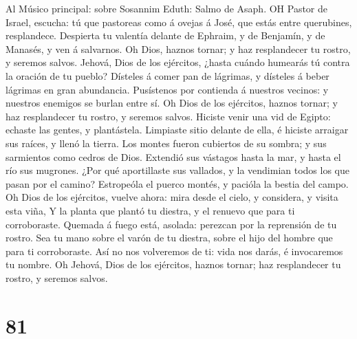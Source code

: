  Al Músico principal: sobre Sosannim Eduth: Salmo de Asaph.
OH Pastor de Israel, escucha: tú que pastoreas como á ovejas á José, que
estás entre querubines, resplandece.  Despierta tu valentía
delante de Ephraim, y de Benjamín, y de Manasés, y ven á salvarnos.
 Oh Dios, haznos tornar; y haz resplandecer tu rostro, y
seremos salvos.  Jehová, Dios de los ejércitos, ¿hasta
cuándo humearás tú contra la oración de tu pueblo?  Dísteles
á comer pan de lágrimas, y dísteles á beber lágrimas en gran abundancia.
 Pusístenos por contienda á nuestros vecinos: y nuestros
enemigos se burlan entre sí.  Oh Dios de los ejércitos,
haznos tornar; y haz resplandecer tu rostro, y seremos salvos.
 Hiciste venir una vid de Egipto: echaste las gentes, y
plantástela.  Limpiaste sitio delante de ella, é hiciste
arraigar sus raíces, y llenó la tierra.  Los montes fueron
cubiertos de su sombra; y sus sarmientos como cedros de Dios.
 Extendió sus vástagos hasta la mar, y hasta el río sus
mugrones.  ¿Por qué aportillaste sus vallados, y la
vendimian todos los que pasan por el camino?  Estropeóla el
puerco montés, y pacióla la bestia del campo.  Oh Dios de
los ejércitos, vuelve ahora: mira desde el cielo, y considera, y visita
esta viña,  Y la planta que plantó tu diestra, y el renuevo
que para ti corroboraste.  Quemada á fuego está, asolada:
perezcan por la reprensión de tu rostro.  Sea tu mano sobre
el varón de tu diestra, sobre el hijo del hombre que para ti
corroboraste.  Así no nos volveremos de ti: vida nos darás,
é invocaremos tu nombre.  Oh Jehová, Dios de los ejércitos,
haznos tornar; haz resplandecer tu rostro, y seremos salvos.

\hypertarget{section-80}{%
\section{81}\label{section-80}}

